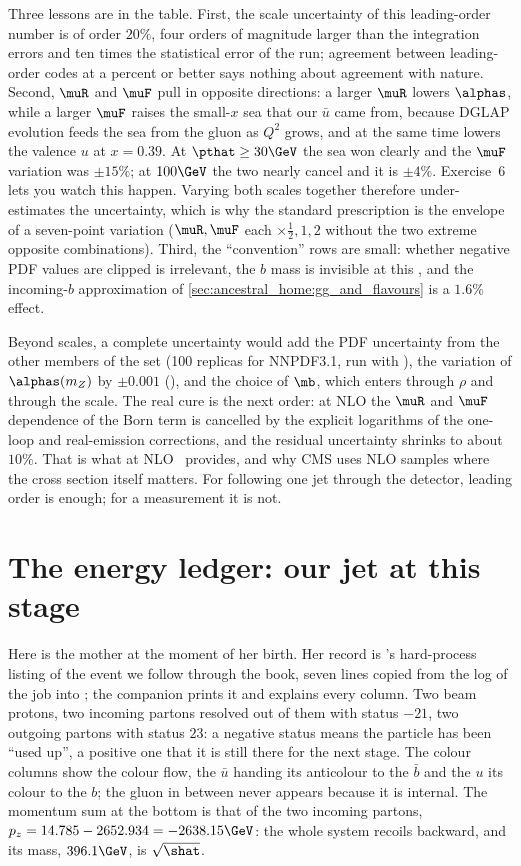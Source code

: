Three lessons are in the table. First, the scale uncertainty of this
leading-order number is of order $20\%$, four orders of magnitude larger than the integration errors and ten times the statistical error of the
\CMSSW run; agreement between leading-order codes at a percent or better says
nothing about agreement with nature. Second, $\muR$ and $\muF$ pull in
opposite directions: a larger $\muR$ lowers $\alphas$, while a larger $\muF$
raises the small-$x$ sea that our $\bar u$ came from, because DGLAP evolution
feeds the sea from the gluon as $Q^2$ grows, and at the same time lowers the
valence $u$ at $x=0.39$. At $\pthat\ge30\GeV$ the sea won clearly and the
$\muF$ variation was $\pm15\%$; at $100\GeV$ the two nearly cancel and it
is $\pm4\%$. Exercise~6 lets you watch this happen. Varying both scales
together therefore under-estimates the uncertainty, which is why the standard
prescription is the envelope of a seven-point variation ($\muR,\muF$ each
$\times\tfrac12,1,2$ without the two extreme opposite combinations). Third,
the ``convention'' rows are small: whether negative PDF values are clipped is
irrelevant, the $b$ mass is invisible at this \pt, and the incoming-$b$
approximation of \cref{sec:ancestral_home:gg_and_flavours} is a $1.6\%$
effect.

Beyond scales, a complete uncertainty would add the PDF uncertainty from the
other members of the set (100 replicas for NNPDF3.1, run with
), the variation of $\alphas(m_Z)$ by $\pm0.001$
(), and the choice of $\mb$, which enters through $\rho$
and through the scale. The real cure is the next order: at NLO the $\muR$
and $\muF$ dependence of the Born term is cancelled by the explicit
logarithms of the one-loop and real-emission corrections, and the residual
uncertainty shrinks to about $10\%$. That is what \MG at
NLO~\cite{Alwall:2014hca} provides, and why CMS uses NLO samples where the
cross section itself matters. For following one jet through the detector,
leading order is enough; for a measurement it is not.

\section{The energy ledger: our jet at this stage}
\label{sec:ancestral_home:our_jet}

Here is the mother at the moment of her birth. Her record is \PYTHIA's
hard-process listing of the event we follow through the book, seven lines
copied from the log of the \CMSSW job into ;
the companion prints it and explains every column. Two beam protons, two
incoming partons resolved out of them with status $-21$, two outgoing
partons with status $23$: a negative status means the particle has been
``used up'', a positive one that it is still there for the next stage. The
colour columns show the colour flow, the $\bar u$ handing its anticolour to
the $\bar b$ and the $u$ its colour to the $b$; the gluon in between never
appears because it is internal. The momentum sum at the bottom is that of
the two incoming partons, $p_z=14.785-2652.934=-2638.15\GeV$: the whole
system recoils backward, and its mass, $396.1\GeV$, is $\sqrt{\shat}$.

